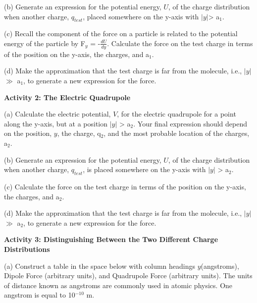 (b) Generate an expression for the potential energy, \( U \), of the charge
distribution when another charge, $q_{test}$,  placed somewhere
on the y-axis with \( \left| y\right|  \)> a\( _{1} \).
\vspace{40mm}

(c) Recall the component of the force on a particle is related to
the potential energy of the particle by F\( _{y} \) = -\( \frac{dU}{dy} \).
Calculate the force on the test charge in terms of the position on
the y-axis, the charges, and a\( _{1} \).
\vspace{40mm}

(d) Make the approximation that the test charge is far from the molecule,
i.e., \( \left| y\right|  \) \( \gg  \) a\( _{1} \), to generate
a new expression for the force.
\vspace{40mm}

\textbf{Activity 2: The Electric Quadrupole} 

(a) Calculate the electric potential, \( V \), for the electric quadrupole
for a point along the y-axis, but at a position \( \left| y\right|  \)
> a\( _{2} \). Your final expression should depend on the position,
\( y \), the charge, q\( _{2} \), and the most probable location of the
charges, a\( _{2} \).
\vspace{40mm}

(b) Generate an expression for the potential energy, \( U \), of the charge
distribution when another charge, $q_{test}$, is placed somewhere
on the y-axis with \( \left| y\right|  \) > a\( _{2} \).
\vspace{40mm}

(c) Calculate the force on the test charge in terms of the position
on the y-axis, the charges, and a\( _{2} \).
\vspace{40mm}

(d) Make the approximation that the test charge is far from the molecule,
i.e., \( \left| y\right|  \) \( \gg  \) a\( _{2} \), to generate
a new expression for the force.
\vspace{40mm}

\textbf{Activity 3: Distinguishing Between the Two Different Charge
Distributions} 

(a) Construct a table in the space below with column headings \( y \)(angstroms),
Dipole Force (arbitrary units), and Quadrupole Force (arbitrary units).
The units of distance known as angstroms are commonly used in atomic
physics. One angstrom is equal to 10\( ^{-10} \) m.
\vspace{40mm}

